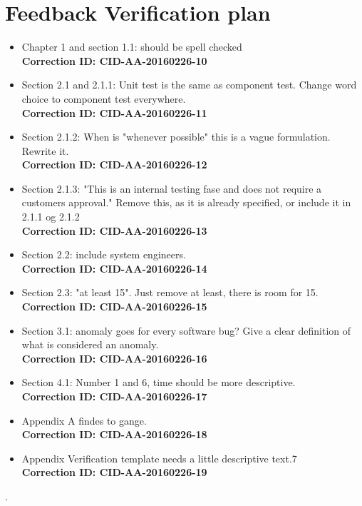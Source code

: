\section*{Feedback Verification plan}
\begin{itemize}
    \item Chapter 1 and section 1.1: should be spell checked
    \\ \textbf{Correction ID: CID-AA-20160226-10}
    
    \item Section 2.1 and 2.1.1: Unit test is the same as component test. Change word choice to component test everywhere.
    \\ \textbf{Correction ID: CID-AA-20160226-11}

    \item Section 2.1.2: When is "whenever possible" this is a vague formulation. Rewrite it.
    \\ \textbf{Correction ID: CID-AA-20160226-12}
   
    \item Section 2.1.3: "This is an internal testing fase and does not require a customers approval." Remove this, as it is already specified, or include it in 2.1.1 og 2.1.2
    \\ \textbf{Correction ID: CID-AA-20160226-13}
    
    \item Section 2.2: include system engineers.
    \\ \textbf{Correction ID: CID-AA-20160226-14}
    
    \item Section 2.3: "at least 15". Just remove at least, there is room for 15.
    \\ \textbf{Correction ID: CID-AA-20160226-15}
    
    \item Section 3.1: anomaly goes for every software bug? Give a clear definition of what is considered an anomaly.
    \\ \textbf{Correction ID: CID-AA-20160226-16}
    
    \item Section 4.1: Number 1 and 6, time should be more descriptive.
    \\ \textbf{Correction ID: CID-AA-20160226-17}
    
    \item Appendix A findes to gange.
    \\ \textbf{Correction ID: CID-AA-20160226-18}
    
    \item Appendix Verification template needs a little descriptive text.7
    \\ \textbf{Correction ID: CID-AA-20160226-19}
\end{itemize}.

